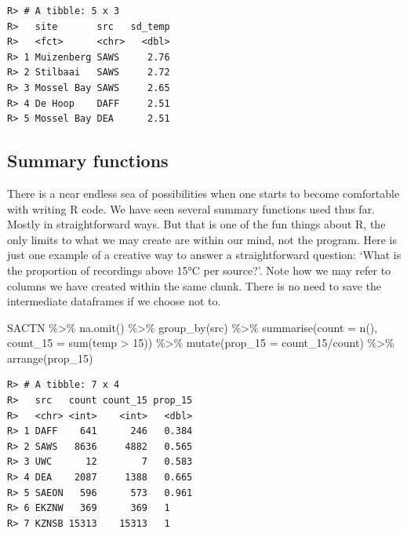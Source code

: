 \documentclass[
]{book}
\newenvironment{Shaded}{\begin{snugshade}}{\end{snugshade}}
\newcommand{\AttributeTok}[1]{\textcolor[rgb]{0.77,0.63,0.00}{#1}}
\newcommand{\DecValTok}[1]{\textcolor[rgb]{0.00,0.00,0.81}{#1}}
\newcommand{\FunctionTok}[1]{\textcolor[rgb]{0.00,0.00,0.00}{#1}}
\newcommand{\NormalTok}[1]{#1}
\newcommand{\SpecialCharTok}[1]{\textcolor[rgb]{0.00,0.00,0.00}{#1}}
\begin{document}
\begin{verbatim}
R> # A tibble: 5 x 3
R>   site       src   sd_temp
R>   <fct>      <chr>   <dbl>
R> 1 Muizenberg SAWS     2.76
R> 2 Stilbaai   SAWS     2.72
R> 3 Mossel Bay SAWS     2.65
R> 4 De Hoop    DAFF     2.51
R> 5 Mossel Bay DEA      2.51
\end{verbatim}

\hypertarget{summary-functions}{%
\subsection{Summary functions}\label{summary-functions}}

There is a near endless sea of possibilities when one starts to become comfortable with writing R code. We have seen several summary functions used thus far. Mostly in straightforward ways. But that is one of the fun things about R, the only limits to what we may create are within our mind, not the program. Here is just one example of a creative way to answer a straightforward question: `What is the proportion of recordings above 15°C per source?'. Note how we may refer to columns we have created within the same chunk. There is no need to save the intermediate dataframes if we choose not to.

\begin{Shaded}
\begin{Highlighting}[]
\NormalTok{SACTN }\SpecialCharTok{\%\textgreater{}\%} 
  \FunctionTok{na.omit}\NormalTok{() }\SpecialCharTok{\%\textgreater{}\%} 
  \FunctionTok{group\_by}\NormalTok{(src) }\SpecialCharTok{\%\textgreater{}\%}
  \FunctionTok{summarise}\NormalTok{(}\AttributeTok{count =} \FunctionTok{n}\NormalTok{(), }
            \AttributeTok{count\_15 =} \FunctionTok{sum}\NormalTok{(temp }\SpecialCharTok{\textgreater{}} \DecValTok{15}\NormalTok{)) }\SpecialCharTok{\%\textgreater{}\%} 
  \FunctionTok{mutate}\NormalTok{(}\AttributeTok{prop\_15 =}\NormalTok{ count\_15}\SpecialCharTok{/}\NormalTok{count) }\SpecialCharTok{\%\textgreater{}\%} 
  \FunctionTok{arrange}\NormalTok{(prop\_15)}
\end{Highlighting}
\end{Shaded}

\begin{verbatim}
R> # A tibble: 7 x 4
R>   src   count count_15 prop_15
R>   <chr> <int>    <int>   <dbl>
R> 1 DAFF    641      246   0.384
R> 2 SAWS   8636     4882   0.565
R> 3 UWC      12        7   0.583
R> 4 DEA    2087     1388   0.665
R> 5 SAEON   596      573   0.961
R> 6 EKZNW   369      369   1    
R> 7 KZNSB 15313    15313   1
\end{verbatim}
\end{document}
